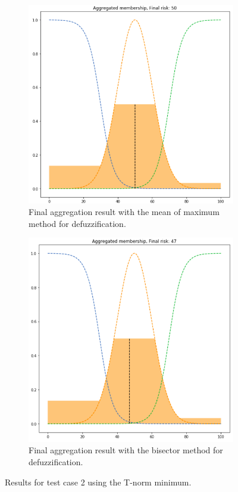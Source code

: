 \documentclass[conference]{IEEEtran}
\begin{document}
\begin{figure}[ht]
\begin{subfigure}{.5\textwidth}
  \label{fig:2min-centroid}
\end{subfigure}
\begin{subfigure}{.5\textwidth}
  \centering
  \includegraphics[width=.8\linewidth]{figures/second/min-mom.png}  
  \caption{Final aggregation result with the mean of maximum method for defuzzification.}
  \label{fig:2min-mom}
\end{subfigure}
\begin{subfigure}{.5\textwidth}
  \centering
  \includegraphics[width=.8\linewidth]{figures/second/min-bisector.png}  
  \caption{Final aggregation result with the bisector method for defuzzification.}
  \label{fig:2min-bisector}
\end{subfigure}
\caption{Results for test case 2 using the T-norm minimum.}
\label{fig:testcase2min}
\end{figure}
\end{document}
